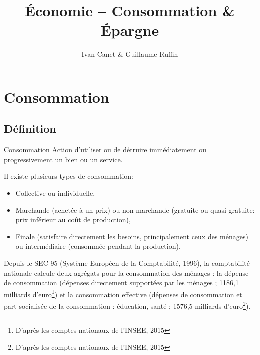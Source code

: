 \documentclass[10pt,a4paper,french]{article}
\begin{document}
\title{Économie -- Consommation \& Épargne}
\author{Ivan Canet \& Guillaume Ruffin}
\maketitle


\tableofcontents

\section{Consommation}

\subsection{Définition}

\begin{cquote}{Consommation}
Action d'utiliser ou de détruire immédiatement ou progressivement un bien ou un service.~
\end{cquote}

Il existe plusieurs types de consommation:
\begin{itemize}
\item Collective ou individuelle,
\item Marchande (achetée à un prix) ou non-marchande (gratuite ou quasi-gratuite: prix inférieur au coût de production),
\item Finale (satisfaire directement les besoins, principalement ceux des ménages) ou intermédiaire (consommée pendant la production).
\end{itemize}

Depuis le SEC 95 (Système Européen de la Comptabilité, 1996), la comptabilité nationale calcule deux agrégats pour la consommation des ménages : la dépense de consommation (dépenses directement supportées par les ménages ; 1186,1 milliards d’euro\footnote{D'après les comptes nationaux de l'INSEE, 2015}) et la consommation effective (dépenses de consommation et part socialisée de la consommation : éducation, santé ; 1576,5 milliards d'euro\footnote{D'après les comptes nationaux de l'INSEE, 2015}).
\end{document}
